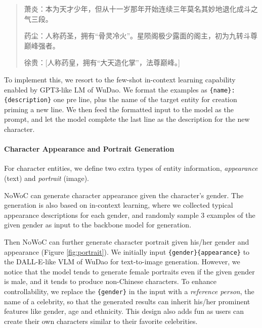 \documentclass{article}
\begin{document}
\begin{quote}
    \begin{CJK}{UTF8}{gbsn}
萧炎：本为天才少年，但从十一岁那年开始连续三年莫名其妙地退化成斗之气三段。

药尘：人称药圣，拥有“骨灵冷火”。星陨阁极少露面的阁主，初为九转斗尊巅峰强者。

徐贵：[人称药皇，拥有“大天造化掌”，法尊巅峰。]
    \end{CJK}
\end{quote}

To implement this, we resort to the few-shot in-context learning capability enabled by GPT3-like LM of WuDao. We format the examples as \texttt{\{name\}: \{description\}} one pre line, plus the name of the target entity for creation priming a new line. We then feed the formatted input to the model as the prompt, and let the model complete the 
last line as the description for the new character.

\paragraph{Character Appearance and Portrait Generation} For character entities, we define two extra types of entity information, \textit{appearance} (text) and \textit{portrait} (image).

NoWoC can generate character appearance given the character's gender. The generation is also based on in-context learning, where we collected typical appearance descriptions for each gender, and randomly sample 3 examples of the given gender as input to the backbone model for generation.

Then NoWoC can further generate character portrait given his/her gender and appearance (Figure \ref{fig:portrait}). We initially input \texttt{\{gender\}\{appearance\}} to the DALL-E-like VLM of WuDao for text-to-image generation. However, we notice that the model tends to generate female portraits even if the given gender is male, and it tends to produce non-Chinese characters. To enhance controllability, we replace the \texttt{\{gender\}} in the input with a \textit{reference person}, the name of a celebrity, so that the generated results can inherit his/her prominent features like gender, age and ethnicity. This design also adds fun as users can create their own characters similar to their favorite celebrities. 
\end{document}
